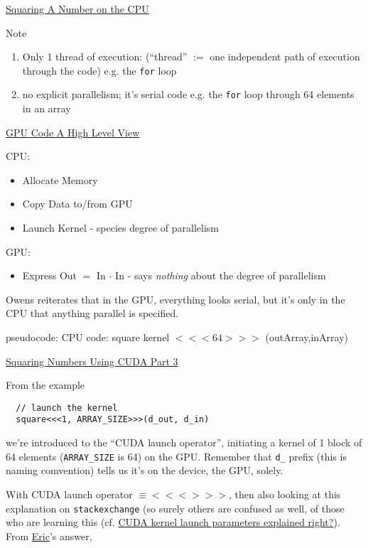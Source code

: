 \documentclass[10pt]{amsart}
\begin{document}
\begin{multicols*}{2}
\href{https://classroom.udacity.com/courses/cs344/lessons/55120467/concepts/670742840923}{Squaring A Number on the CPU}

Note
\begin{enumerate}
\item Only 1 thread of execution: (``thread'' $:=$ one independent path of execution through the code) e.g. the \verb|for| loop
  \item no explicit parallelism; it's serial code e.g. the \verb|for| loop through 64 elements in an array
  \end{enumerate}


\href{https://classroom.udacity.com/courses/cs344/lessons/55120467/concepts/670742870923}{GPU Code A High Level View}

CPU:
\begin{itemize}
  \item Allocate Memory 
  \item Copy Data to/from GPU
    \item Launch Kernel - species degree of parallelism
\end{itemize}

GPU:
\begin{itemize}
\item Express Out $=$ In $\cdot $ In  - says \emph{nothing} about the degree of parallelism
  \end{itemize}

Owens reiterates that in the GPU, everything looks serial, but it's only in the CPU that anything parallel is specified.  

pseudocode: CPU code: square kernel $<<< 64 >>>$ (outArray,inArray)

\href{https://classroom.udacity.com/courses/cs344/lessons/55120467/concepts/670742940923}{Squaring Numbers Using CUDA Part 3}

From the example
\begin{lstlisting}
  // launch the kernel
  square<<<1, ARRAY_SIZE>>>(d_out, d_in)
  \end{lstlisting}
we're introduced to the ``CUDA launch operator'', initiating a kernel of 1 block of 64 elements (\verb|ARRAY_SIZE| is 64) on the GPU.  Remember that \verb|d_| prefix (this is naming comvention) tells us it's on the device, the GPU, solely.  

With CUDA launch operator $\equiv <<<>>>$, then also looking at this explanation on \verb|stackexchange| (so surely others are confused as well, of those who are learning this (cf. \href{http://stackoverflow.com/questions/19240658/cuda-kernel-launch-parameters-explained-right}{CUDA kernel launch parameters explained right?}).  From \href{http://stackoverflow.com/users/1957265/eric}{Eric}'s answer, \\


\end{multicols*}
\end{document}
